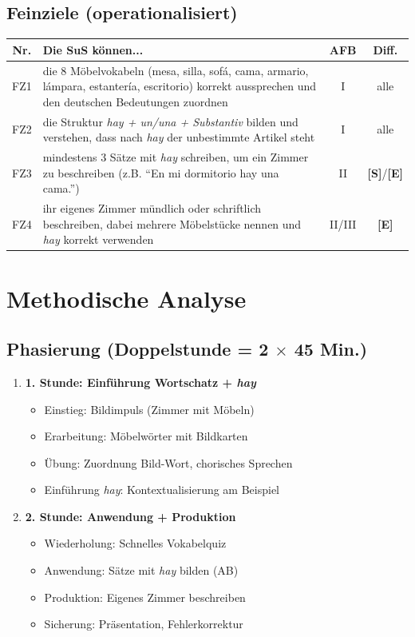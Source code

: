 \documentclass[11pt,a4paper]{article}
\newcommand{\Std}{\textcolor{standard}{\textbf{[S]}}}
\newcommand{\E}{\textcolor{erweiterung}{\textbf{[E]}}}
\begin{document}
\subsection{Feinziele (operationalisiert)}
\begin{tabular}{|c|p{8cm}|c|c|}
\hline
\textbf{Nr.} & \textbf{Die SuS können...} & \textbf{AFB} & \textbf{Diff.} \\
\hline
FZ1 & die 8 Möbelvokabeln (mesa, silla, sofá, cama, armario, lámpara, estantería, escritorio) korrekt aussprechen und den deutschen Bedeutungen zuordnen & I & alle \\
\hline
FZ2 & die Struktur \textit{hay + un/una + Substantiv} bilden und verstehen, dass nach \textit{hay} der unbestimmte Artikel steht & I & alle \\
\hline
FZ3 & mindestens 3 Sätze mit \textit{hay} schreiben, um ein Zimmer zu beschreiben (z.B. ``En mi dormitorio hay una cama.'') & II & \Std{}/\E{} \\
\hline
FZ4 & ihr eigenes Zimmer mündlich oder schriftlich beschreiben, dabei mehrere Möbelstücke nennen und \textit{hay} korrekt verwenden & II/III & \E{} \\
\hline
\end{tabular}

\section{Methodische Analyse}

\subsection{Phasierung (Doppelstunde = 2 $\times$ 45 Min.)}
\begin{enumerate}
    \item \textbf{1. Stunde: Einführung Wortschatz + \textit{hay}}
    \begin{itemize}
        \item Einstieg: Bildimpuls (Zimmer mit Möbeln)
        \item Erarbeitung: Möbelwörter mit Bildkarten
        \item Übung: Zuordnung Bild-Wort, chorisches Sprechen
        \item Einführung \textit{hay}: Kontextualisierung am Beispiel
    \end{itemize}
    \item \textbf{2. Stunde: Anwendung + Produktion}
    \begin{itemize}
        \item Wiederholung: Schnelles Vokabelquiz
        \item Anwendung: Sätze mit \textit{hay} bilden (AB)
        \item Produktion: Eigenes Zimmer beschreiben
        \item Sicherung: Präsentation, Fehlerkorrektur
    \end{itemize}
\end{enumerate}
\end{document}
